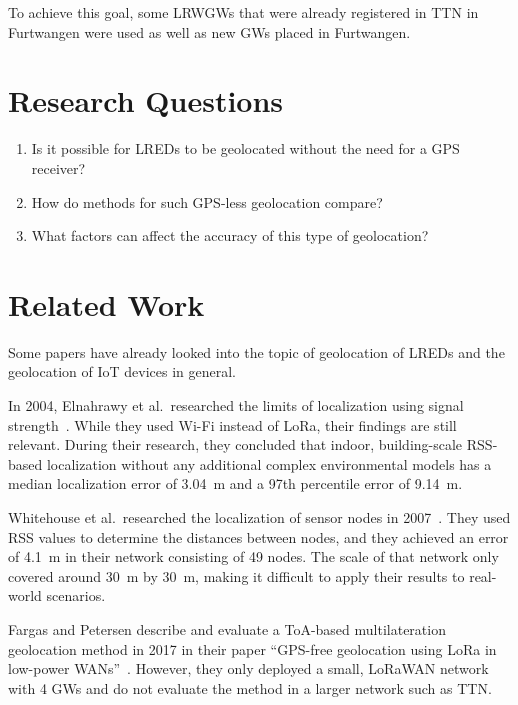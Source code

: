 To achieve this goal, some \aclp{LRWGW} that were already registered in \acf{TTN} in Furtwangen were used as well as new \aclp{GW} placed in Furtwangen.

\section{Research Questions}\label{sec:introduction-research-questions}

\begin{enumerate}
      \item Is it possible for \aclp{LRED} to be geolocated without the need for a \ac{GPS} receiver?
      \item How do methods for such \ac{GPS}-less geolocation compare?
      \item What factors can affect the accuracy of this type of geolocation?
\end{enumerate}

\section{Related Work}\label{sec:related-work}

Some papers have already looked into the topic of geolocation of \aclp{LRED} and the geolocation of \ac{IoT} devices in general.

In 2004, Elnahrawy et al.\ researched the limits of localization using signal strength~\cite{elnahrawy_limits_2004}.
While they used Wi-Fi instead of \ac{LoRa}, their findings are still relevant.
During their research, they concluded that indoor, building-scale \ac{RSS}-based localization without any additional complex environmental models has a median localization error of \SI{3.04}{\meter} and a 97th percentile error of \SI{9.14}{\meter}.

Whitehouse et al.\ researched the localization of sensor nodes in 2007~\cite{whitehouse_practical_2007}.
They used \ac{RSS} values to determine the distances between nodes, and they achieved an error of \SI{4.1}{\meter} in their network consisting of 49 nodes.
The scale of that network only covered around \SI{30}{\meter} by \SI{30}{\meter}, making it difficult to apply their results to real-world scenarios.

Fargas and Petersen describe and evaluate a \ac{ToA}-based multilateration geolocation method in 2017 in their paper ``\acs{GPS}-free geolocation using \acs{LoRa} in low-power \acsp{WAN}''~\cite{fargas_gps-free_2017}.
However, they only deployed a small, \ac{LoRaWAN} network with 4 \aclp{GW} and do not evaluate the method in a larger network such as \ac{TTN}.

